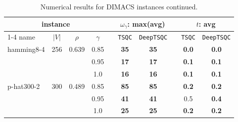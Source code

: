 \begin{table}[h!]
    \footnotesize
    \caption{Numerical results for DIMACS instances continued.}
    \label{tab: dimacs cont}
    \centering
    \begin{tabular}{l c c c c c c c c c}
    \toprule
    \toprule
    \multicolumn{4}{c}{instance} & & \multicolumn{2}{c}{$\omega_{\gamma}$: max(avg)} & &
    \multicolumn{2}{c}{$t$: avg} \\
    \cmidrule{1-4} \cmidrule{6-7} \cmidrule{9-10}
    name & $|V|$ & $\rho$ & $\gamma$ & & \texttt{TSQC} & \texttt{DeepTSQC} & & \texttt{TSQC} & \texttt{DeepTSQC} \\
    \midrule
hamming8-4 & 256 & 0.639 & 0.85 & & \textbf{35} & \textbf{35} & & \textbf{0.0} & \textbf{0.0} \\
& & & 0.95 & & \textbf{17} & \textbf{17} & & \textbf{0.1} & \textbf{0.1} \\
& & & 1.0 & & \textbf{16} & \textbf{16} & & \textbf{0.1} & \textbf{0.1} \\
\midrule
p-hat300-2 & 300 & 0.489 & 0.85 & & \textbf{85} & \textbf{85} & & \textbf{0.2} & \textbf{0.2} \\
& & & 0.95 & & \textbf{41} & \textbf{41} & & 0.5 & \textbf{0.4} \\
& & & 1.0 & & \textbf{25} & \textbf{25} & & \textbf{0.2} & \textbf{0.2} \\

    \bottomrule
    \bottomrule
    \end{tabular}
    \end{table}